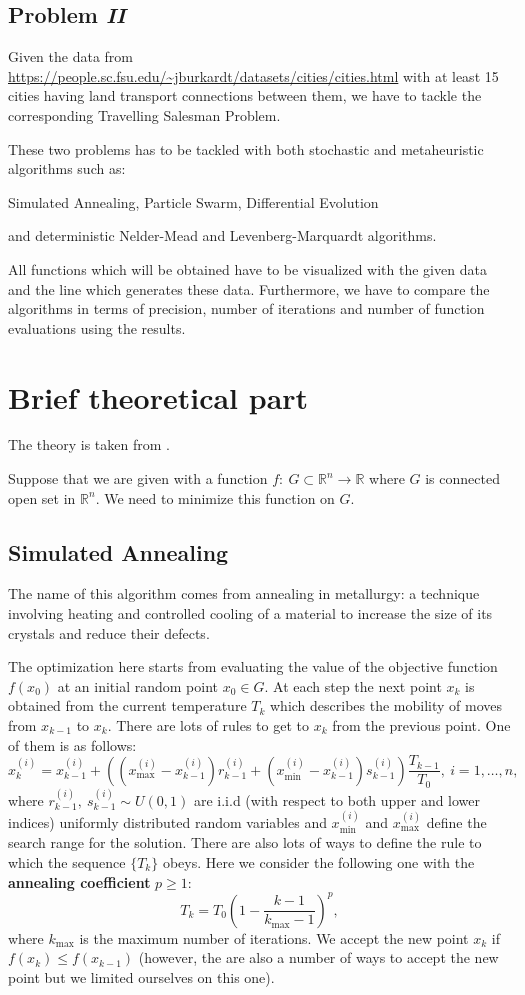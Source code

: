 \documentclass[12pt, bachelor, substylefile = algo_title.rtx]{disser}
\newcommand{\Real}{\mathbb{R}}
\theoremstyle{definition}
\begin{document}
\subsection{Problem \textit{II}}
Given the data from \url{https://people.sc.fsu.edu/~jburkardt/datasets/cities/cities.html} with at least 15 cities having land transport connections between them, we have to tackle the corresponding Travelling Salesman Problem.

These two problems has to be tackled with both stochastic and metaheuristic algorithms such as:
\begin{outline}
\1 Simulated Annealing,
\1 Particle Swarm,
\1 Differential Evolution
\end{outline}
and deterministic Nelder-Mead and Levenberg-Marquardt algorithms.

All functions which will be obtained have to be visualized with the given data and the line which generates these data. Furthermore, we have to compare the algorithms in terms of precision, number of iterations and number of function evaluations using the results.

\section{Brief theoretical part}
The theory is taken from \cite{cavazzuti13}.

Suppose that we are given with a function $f:\ G \subset \Real^n \to \Real$ where $G$ is connected open set in $\Real^n$. We need to minimize this function on $G$.

\subsection{Simulated Annealing}
The name of this algorithm comes from annealing in metallurgy: a technique involving heating and controlled cooling of a material to increase the size of its crystals and reduce their defects.

The optimization here starts from evaluating the value of the objective function $f(x_0)$
at an initial random point $x_0 \in G$. At each step the next point $x_k$ is obtained from the current temperature $T_k$ which describes the mobility of moves from $x_{k-1}$ to $x_k$. There are lots of rules to get to $x_k$ from the previous point. One of them is as follows:
\[ x^{(i)}_{k} = x^{(i)}_{k-1} + \left((x^{(i)}_{\max} - x^{(i)}_{k-1})r^{(i)}_{k-1} + (x^{(i)}_{\min} - x^{(i)}_{k-1})s^{(i)}_{k-1}\right) \frac{T_{k-1}}{T_0},\ i = 1, \dots, n ,\]
where $r^{(i)}_{k-1},\ s^{(i)}_{k-1} \sim U(0, 1)$ are i.i.d (with respect to both upper and lower indices) uniformly distributed random variables and $x^{(i)}_{\min}$ and $x^{(i)}_{\max}$ define the search range for the solution. There are also lots of ways to define the rule to which the sequence $\{T_k\}$ obeys. Here we consider the following one with the \textbf{annealing coefficient} $p \ge 1$:
\[ T_k = T_0 \left(1 - \frac{k - 1}{k_{\max} - 1}\right)^p, \]
where $k_{\max}$ is the maximum number of iterations. We accept the new point $x_k$ if $f(x_k) \le f(x_{k-1})$ (however, the are also a number of ways to accept the new point but we limited ourselves on this one).
\end{document}
